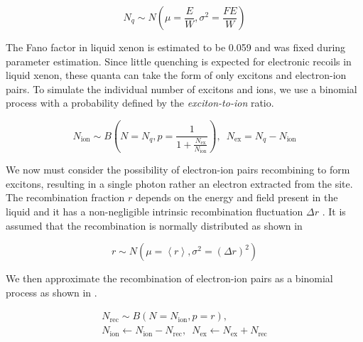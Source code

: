 \begin{equation}
        \label{eqn:xe1t_er_fano}
        N_q \sim N \left( \mu = \frac{E}{W}, \sigma^2 = \frac{F E}{W} \right) 
\end{equation}

The Fano factor in liquid xenon is estimated to be 0.059 \cite{doke1976estimation} and was fixed during parameter estimation.  Since little quenching is expected for electronic recoils in liquid xenon, these quanta can take the form of only excitons and electron-ion pairs.   To simulate the individual number of excitons and ions, we use a binomial process with a probability defined by the \textit{exciton-to-ion} ratio.


\begin{equation}
        \label{eqn:xe1t_er_exciton_ion}
        N_{\textrm{ion}} \sim B \left( N=N_q, p = \frac{1}{1 + \frac{N_{\textrm{ex}}}{N_{\textrm{ion}}}} \right) , \, \, \, N_{\textrm{ex}} = N_q - N_{\textrm{ion}}
\end{equation}


We now must consider the possibility of electron-ion pairs recombining to form excitons, resulting in a single photon rather an electron extracted from the site.  The recombination fraction $r$ depends on the energy and field present in the liquid and it has a non-negligible intrinsic recombination fluctuation $\Delta r$ \cite{akerib2016tritium, aprile2017tritium}.  It is assumed that the recombination is normally distributed as shown in 

\begin{equation}
        \label{eqn:xe1t_recombination_fluc}
        r \sim N(\mu = \left< r \right>, \sigma^2 = (\Delta r)^2)
\end{equation}

We then approximate the recombination of electron-ion pairs as a binomial process as shown in .

\begin{equation}
        \label{eqn:xe1t_recombination}
        \begin{gathered}
                N_{\textrm{rec}} \sim B(N = N_{\textrm{ion}}, p = r), \\ 
                N_{\textrm{ion}} \leftarrow N_{\textrm{ion}} - N_{\textrm{rec}}, \, \, \,  N_{\textrm{ex}} \leftarrow N_{\textrm{ex}} + N_{\textrm{rec}}
        \end{gathered}
\end{equation}


